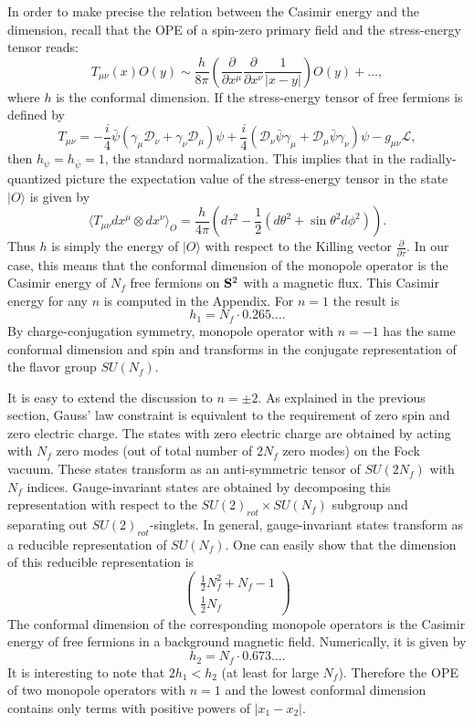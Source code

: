 \documentclass[a4paper,12pt, amsfonts, amssymb]{article}
\newcommand{\bpsi}{{\bar\psi}}
\newcommand{\cD}{{\mathcal D}}
\newcommand{\cL}{{\mathcal L}}
\begin{document}
In order to make precise the relation between the Casimir energy and
the dimension, recall that the OPE of a spin-zero primary field and
the stress-energy tensor reads:
$$
T_{\mu\nu}(x) O(y) \sim \frac{h}{8\pi} \left(
\frac{\partial}{\partial x^\mu}\frac{\partial}{\partial x^\nu}
\frac{1}{|x-y|}\right) O(y) + \ldots,
$$
where $h$ is the conformal dimension. 
If the stress-energy tensor of free fermions is defined by
$$
T_{\mu\nu}=-\frac{i}{4}\bpsi\left(\gamma_\mu\cD_\nu+
\gamma_\nu\cD_\mu\right)\psi+\frac{i}{4}\left(\cD_\nu\bpsi\gamma_\mu+
\cD_\mu \bpsi\gamma_\nu\right)\psi-g_{\mu\nu}\cL,
$$
then $h_\psi=h_{\bpsi}=1$, the standard normalization.
This implies that in the radially-quantized picture the expectation
value of the stress-energy tensor in the state $\vert O\rangle$
is given by
$$
\langle T_{\mu\nu} dx^\mu\otimes dx^\nu\rangle_O=\frac{h}{4\pi}\left(d\tau^2-
\frac{1}{2}(d\theta^2+\sin\theta^2 d\phi^2)\right).
$$
Thus $h$ is simply the energy of $\vert O\rangle$ with respect to the
Killing vector $\frac{\partial}{\partial \tau}.$ In our case, this means
that the conformal dimension of the monopole operator is the Casimir
energy of $N_f$ free fermions on ${\bf S}^2$ with a magnetic flux.
This Casimir energy for any $n$ is computed in the Appendix. 
For $n=1$ the result is
$$
h_1=N_f \cdot 0.265\ldots.
$$ 
By charge-conjugation symmetry, monopole operator with $n=-1$ has the
same conformal dimension and spin and transforms in the conjugate
representation of the flavor group $SU(N_f).$ 

It is easy to extend the discussion to $n=\pm 2$. As explained in the
previous section, Gauss' law constraint is equivalent to the requirement
of zero spin and zero electric charge. The states with zero
electric charge are obtained by acting with $N_f$ zero modes (out of total
number of $2N_f$ zero modes) on the Fock vacuum. These states transform
as an anti-symmetric tensor of $SU(2N_f)$ with $N_f$ indices.
Gauge-invariant states are obtained by decomposing this representation
with respect to the $SU(2)_{rot}\times SU(N_f)$ subgroup and separating
out $SU(2)_{rot}$-singlets. In general, gauge-invariant states transform
as a reducible representation of $SU(N_f)$. One can easily show that
the dimension of this reducible representation is 
$$
\left(\begin{array}{c} \frac{1}{2}N_f^2+N_f-1 \\ \frac{1}{2} N_f \end{array}\right)
$$
The conformal dimension
of the corresponding monopole operators is the Casimir energy of
free fermions in a background magnetic field. Numerically, it is
given by
$$
h_2=N_f\cdot 0.673\ldots.
$$
It is interesting to note that $2h_1<h_2$ (at least for large $N_f$).
Therefore the
OPE of two monopole operators with $n=1$ and the lowest conformal dimension contains only terms with positive powers of $|x_1-x_2|$. 
\end{document}
